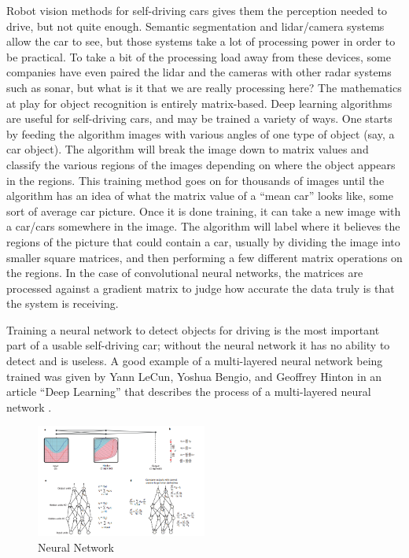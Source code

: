 \documentclass[12pt]{article}
\begin{document}
 Robot vision methods for self-driving cars gives them the perception needed to drive, but not quite enough. Semantic segmentation and lidar/camera systems allow the car to see, but those systems take a lot of processing power in order to be practical. To take a bit of the processing load away from these devices, some companies have even paired the lidar and the cameras with other radar systems such as sonar, but what is it that we are really processing here? The mathematics at play for object recognition is entirely matrix-based. Deep learning algorithms are useful for self-driving cars, and may be trained a variety of ways. One starts by feeding the algorithm images with various angles of one type of object (say, a car object). The algorithm will break the image down to matrix values and classify the various regions of the images depending on where the object appears in the regions. This training method goes on for thousands of images until the algorithm has an idea of what the matrix value of a “mean car” looks like, some sort of average car picture. Once it is done training, it can take a new image with a car/cars somewhere in the image. The algorithm will label where it believes the regions of the picture that could contain a car, usually by dividing the image into smaller square matrices, and then performing a few different matrix operations on the regions. In the case of convolutional neural networks, the matrices are processed against a gradient matrix to judge how accurate the data truly is that the system is receiving. \newline
 
 Training a neural network to detect objects for driving is the most important part of a usable self-driving car; without the neural network it has no ability to detect and is useless. A good example of a multi-layered neural network being trained was given by Yann LeCun, Yoshua Bengio, and Geoffrey Hinton in an article “Deep Learning” that describes the process of a multi-layered neural network \cite{deepLearning}.
	
	\begin{figure}
		\begin{center}
			\includegraphics[width=0.5\textwidth]{recognition}
		\end{center}
		\caption{Neural Network \cite{deepLearning}}
	\end{figure}
  
\end{document}
